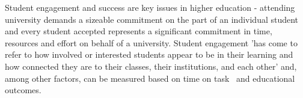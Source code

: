\documentclass[sigconf]{acmart}
\begin{document}

Student engagement and success are key issues in higher education - attending university demands a sizeable commitment on the part of an individual student and every student accepted represents a significant commitment in time, resources and effort on behalf of a university. Student engagement 'has come to refer to how involved or interested students appear to be in their learning and how connected they are to their classes, their institutions, and each other'\citep[p.~38]{Axelson2010} and, among other factors, can be measured based on time on task~\cite{kuh2009national} and educational outcomes.
\end{document}
